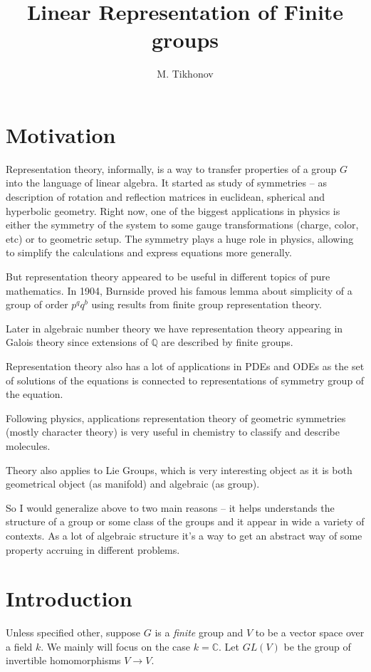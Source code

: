 \documentclass{amsart}
\title{Linear Representation of Finite groups}
\author{M. Tikhonov}
\begin{document}
\maketitle
\newtheorem{definition}{Definition}
\newtheorem{note}{Note}
\newtheorem{lemma}{Lemma}
\newtheorem{theorem}{Theorem}
\newtheorem{example}{Ex.}
\newtheorem{claim}{Claim}

\section{Motivation}

Representation theory, informally, is a way to transfer properties of a group $G$  into the language of linear algebra. 
It started as study of symmetries -- as description of rotation and reflection matrices in euclidean, spherical and hyperbolic geometry. 
Right now, one of the biggest applications in physics is either the symmetry of the system to some gauge transformations (charge, color, etc) or to geometric setup. 
The symmetry plays a huge role in physics, allowing to simplify the calculations and express equations more generally.

But representation theory appeared to be useful in different topics of pure mathematics.  
In 1904, Burnside proved his famous lemma about simplicity of a group of order $p^q q^b$ using results from finite group representation theory.

Later in algebraic number theory we have representation theory appearing in Galois theory since extensions of $\mathbb{Q}$ are described by finite groups.

Representation theory also has a lot of applications in PDEs and ODEs as the set of solutions of the equations is connected to representations of symmetry group of the equation.

Following physics, applications representation theory of geometric symmetries (mostly character theory) is very useful in chemistry to classify and describe molecules.

Theory also applies to Lie Groups, which is very interesting object as it is both geometrical object (as manifold) and algebraic (as group).

So I would generalize above to two main reasons -- it helps understands the structure of a group or some class of the groups and it appear in wide a variety of contexts.
As a lot of algebraic structure it's a way to get an abstract way of some property accruing in different problems.

\section{Introduction}
Unless specified other, suppose $G$ is a \textit{finite} group and $V$ to be a vector space over a field $k$. We mainly will focus on the case $k=\mathbb{C}$.
 Let $GL(V)$ be the group of invertible homomorphisms $V \to V$.
\end{document}
